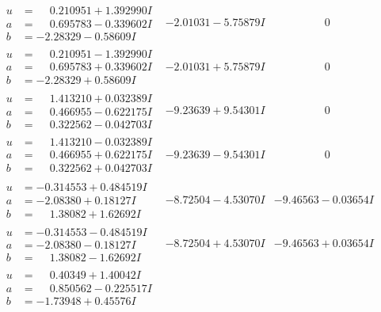 \documentclass[1p]{elsarticle_modified}
\theoremstyle{definition}
\begin{document}
$$\begin{array}{c|c|c}
\begin{aligned}
u &= \phantom{-}0.210951 + 1.392990 I \\
a &= \phantom{-}0.695783 - 0.339602 I \\
b &= -2.28329 - 0.58609 I\end{aligned}
 & -2.01031 - 5.75879 I & \phantom{-0.000000 } 0 \\ \hline\begin{aligned}
u &= \phantom{-}0.210951 - 1.392990 I \\
a &= \phantom{-}0.695783 + 0.339602 I \\
b &= -2.28329 + 0.58609 I\end{aligned}
 & -2.01031 + 5.75879 I & \phantom{-0.000000 } 0 \\ \hline\begin{aligned}
u &= \phantom{-}1.413210 + 0.032389 I \\
a &= \phantom{-}0.466955 - 0.622175 I \\
b &= \phantom{-}0.322562 - 0.042703 I\end{aligned}
 & -9.23639 + 9.54301 I & \phantom{-0.000000 } 0 \\ \hline\begin{aligned}
u &= \phantom{-}1.413210 - 0.032389 I \\
a &= \phantom{-}0.466955 + 0.622175 I \\
b &= \phantom{-}0.322562 + 0.042703 I\end{aligned}
 & -9.23639 - 9.54301 I & \phantom{-0.000000 } 0 \\ \hline\begin{aligned}
u &= -0.314553 + 0.484519 I \\
a &= -2.08380 + 0.18127 I \\
b &= \phantom{-}1.38082 + 1.62692 I\end{aligned}
 & -8.72504 - 4.53070 I & -9.46563 - 0.03654 I \\ \hline\begin{aligned}
u &= -0.314553 - 0.484519 I \\
a &= -2.08380 - 0.18127 I \\
b &= \phantom{-}1.38082 - 1.62692 I\end{aligned}
 & -8.72504 + 4.53070 I & -9.46563 + 0.03654 I \\ \hline\begin{aligned}
u &= \phantom{-}0.40349 + 1.40042 I \\
a &= \phantom{-}0.850562 - 0.225517 I \\
b &= -1.73948 + 0.45576 I\end{aligned}

\end{array}$$
\end{document}

